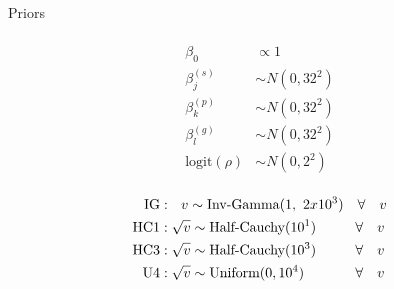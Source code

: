\documentclass[ xcolor = pdftex, dvipsnames, table ]{beamer}
\begin{document}
\subsection{}
\begin{frame}{Priors}
$~$
\hspace*{-1.5cm}
\begin{minipage}{0.45\textwidth}
\begin{align*}
&\\
\beta_0 &\propto 1\\
\beta^{(s)}_j &\sim N(0, 32^2)\\
\beta^{(p)}_k &\sim N(0, 32^2)\\
\beta^{(g)}_l &\sim N(0, 32^2)\\
\text{logit}(\rho) &\sim N(0, 2^2)\\
\end{align*}
\end{minipage}
\begin{minipage}{0.55\textwidth}
\begin{align*}
\text{IG}  &: ~~v \sim \text{Inv-Gamma}(1,~2x10^{3}) ~~~\forall~~~v \\ 
\text{HC1} &: \sqrt{v} \sim \text{Half-Cauchy}(10^1) \hspace{0.05cm}~~~~~~~~\forall~~~v \\
\text{HC3} &: \sqrt{v} \sim \text{Half-Cauchy}(10^3) \hspace{0.05cm}~~~~~~~~\forall~~~v \\
\text{U4}  &: \sqrt{v} \sim \text{Uniform}(0, 10^4) ~~~~~~~~~~~\forall~~~v
\end{align*}
\end{minipage}
\end{frame}

%
%
\end{document}
